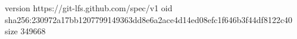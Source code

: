 version https://git-lfs.github.com/spec/v1
oid sha256:230972a17bb1207799149363dd8e6a2ace4d14ed08efc1f646b3f44df8122c40
size 349668
